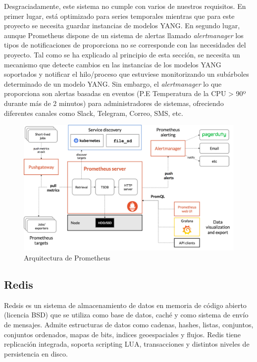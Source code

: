 Desgraciadamente, este sistema no cumple con varios de nuestros requisitos. En primer lugar,
está optimizado para series temporales mientras que para este proyecto se necesita guardar
instancias de modelos YANG. En segundo lugar, aunque Prometheus dispone de un sistema de alertas
llamado \textit{alertmanager} los tipos de notificaciones de proporciona no se corresponde con las 
necesidades del proyecto. Tal como se ha explicado al principio de esta sección, se necesita un 
mecanismo que detecte cambios en las instancias de los modelos YANG soportados y notificar el 
hilo/proceso que estuviese monitorizando un subárboles determinado de un modelo YANG. Sin embargo,
el \textit{alertmanager} lo que proporciona son alertas basadas en eventos (P.E Temperatura de la 
CPU > 90º durante más de 2 minutos) para administradores de sistemas, ofreciendo diferentes canales
como Slack, Telegram, Correo, SMS, etc. 


\begin{figure}
    \centering
    \includegraphics[width=15cm]{graphics/prometheus_architecture.png}
    \caption{Arquitectura de Prometheus}
    \label{fig:prometheus_estructura}
\end{figure}

\subsection{Redis} 
Redsis \cite{redsis_main_page} es un sistema de almacenamiento de datos en memoria de código abierto (licencia BSD) que se utiliza como base de datos, caché y como sistema de envío de mensajes. Admite estructuras de datos como cadenas, hashes, listas, conjuntos, conjuntos ordenados, mapas de bits, indices geoespaciales y flujos. Redis tiene replicación integrada, soporta scripting LUA, transacciones y distintos niveles de persistencia en disco. 

